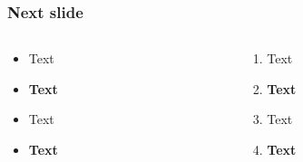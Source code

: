\documentclass{beamer}
\begin{document}
\begin{frame}
  \frametitle{Next slide}
  \begin{columns}[onlytextwidth]
    \begin{column}{0.5\textwidth}
      \begin{itemize}
        \item Text
        \item \textbf{Text}
          \item \textcolor{cvut_navy}{Text}
          \item \textcolor{cvut_navy}{\textbf{Text}}
      \end{itemize}
    \end{column}

      \begin{column}{0.5\textwidth}
       \begin{enumerate}
        \item Text
        \item \textbf{Text}
          \item \textcolor{cvut_navy}{Text}
          \item \textcolor{cvut_navy}{\textbf{Text}}
      \end{enumerate}
    \end{column}
  \end{columns}
\end{frame}
\end{document}

